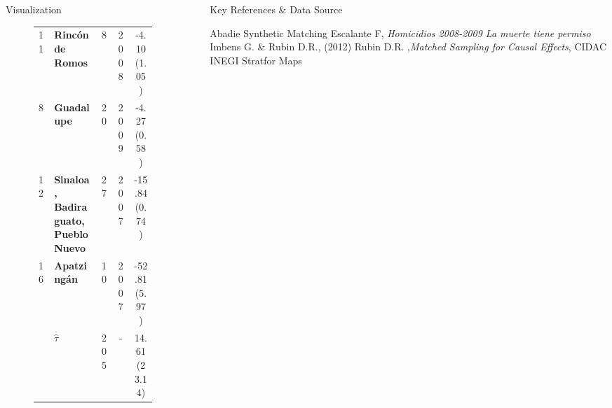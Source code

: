 \documentclass[final]{beamer}
\newlength{\sepwid}
\newlength{\onecolwid}
\newlength{\twocolwid}
\newlength{\threecolwid}
\begin{document}
\begin{frame}[t]
\begin{columns}[t]
\begin{column}{\twocolwid}
\begin{block}{ Visualization}
\begin{figure}[htdp]
\begin{minipage}[ht]{0.58\linewidth}
{\begin{tabular}{llccc}
                11&		\textbf{Rinc\'{o}n de Romos} & 8 & 2008& -4.10  (1.05)\\  
                8&		  \textbf{Guadalupe} &  20 & 2009 & -4.27  (0.58) \\  
                12&		\textbf{Sinaloa, Badiraguato, Pueblo Nuevo}&27 & 2007  & -15.84  (0.74) \\ 
                16&		\textbf{Apatzing\'{a}n} &10 & 2007  &-52.81  (5.97) \\ 
                \hline
                \hline 
                &		 \textbf{$\hat{\tau}$}& 205& - &14.61 (23.14)\\
                \hline
              \end{tabular}}
          \end{minipage}\hfill
          
        \end{figure}
      \end{block}
    \end{column}

    \begin{column}{\sepwid}\end{column}	

  

    \begin{column}{\onecolwid}
      \begin{block}{Key References \& Data Source}
   
        
        \small{\begin{thebibliography}{99}
           Abadie  Synthetic Matching 
           Escalante F, \emph{Homicidios 2008-2009 La muerte tiene permiso}
           Imbens G. \& Rubin D.R., (2012)
           Rubin D.R. ,\emph{Matched Sampling for Causal Effects},
           CIDAC
           INEGI
           Stratfor Maps
          \end{thebibliography}}
        

\end{block}
\end{column}
\end{columns}
\end{frame}
\end{document}

